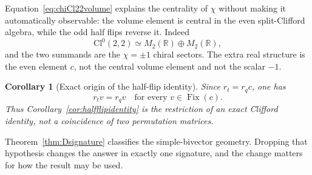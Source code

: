 \documentclass[11pt]{article}
\newtheorem{corollary}[theorem]{Corollary}
\theoremstyle{definition}\newtheorem{definition}[theorem]{Definition}
\theoremstyle{remark}\newtheorem{remark}[theorem]{Remark}\newtheorem{conjecture}[theorem]{Conjecture}
\begin{document}
Equation~\eqref{eq:chiCl22volume} explains the centrality of $\chi$ without making it automatically observable: the volume element is central in the even split-Clifford algebra, while the odd half flips reverse it. Indeed
\begin{equation}
 \mathrm{Cl}^0(2,2)\simeq M_2(\mathbb R)\oplus M_2(\mathbb R),
\end{equation}
and the two summands are the $\chi=\pm1$ chiral sectors. The extra real structure is the even element $c$, not the central volume element and not the scalar $-1$.

\begin{corollary}[Exact origin of the half-flip identity]\label{cor:Cl22halfflip}
Since $r_t=r_qc$, one has
\begin{equation}
 \boxed{r_t v=r_qv\quad\text{for every }v\in\operatorname{Fix}(c).}
\end{equation}
Thus Corollary~\ref{cor:halfflipidentity} is the restriction of an exact Clifford identity, not a coincidence of two permutation matrices.
\end{corollary}

Theorem~\ref{thm:Dsignature} classifies the simple-bivector geometry. Dropping that hypothesis changes the answer in exactly one signature, and the change matters for how the result may be used.
\end{document}
